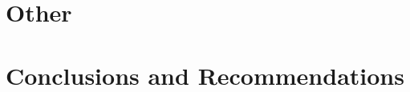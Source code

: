 \documentclass[a4paper,12pt]{article}
\begin{document}
	\section{Other}	 
		
		
		
		
		
	\section{Conclusions and Recommendations}	 
		
	
	
\end{document}
